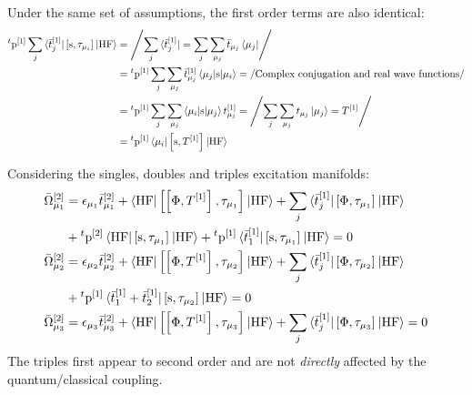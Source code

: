 Under the same set of assumptions, the first order terms are also identical:
\begin{equation}
  \begin{aligned}
  {}^t\mathrm{p}^{[1]} \sum_j\braket{\bar{t}_{j}^{[1]} | \left[ \mathrm{s}, \tau_{\mu_i} \right]^{} | \mathrm{HF}}
  &= \left/ \sum_j\bra{\bar{t}_{j}^{[1]}} = \sum_j\sum_{\mu_j}\bar{t}_{\mu_j}\bra{\mu_j}  \right/ \\
  &=
  {}^t\mathrm{p}^{[1]} \sum_j\sum_{\mu_j}\bar{t}_{\mu_j}^{[1]} \braket{\mu_j| \mathrm{s} | \mu_i}
  = \left/ \text{Complex conjugation and real wave functions} \right/ \\
  &=
  {}^t\mathrm{p}^{[1]} \sum_j\sum_{\mu_j} \braket{\mu_i| \mathrm{s} | \mu_j} t_{\mu_j}^{[1]}
  = \left/ \sum_j\sum_{\mu_j}t_{\mu_j}\ket{\mu_j}  = T^{[1]}\right/ \\
  &=
  {}^t\mathrm{p}^{[1]}\braket{\mu_i | \left[ \mathrm{s}, T^{[1]} \right]^{} | \mathrm{HF}}
 \end{aligned}
\end{equation}

Considering the singles, doubles and triples excitation manifolds:
\begin{subequations}
  \begin{align}
    \bar{\Omega}_{\mu_1}^{[2]} &=
      \epsilon_{\mu_1}\bar{t}_{\mu_1}^{[2]}
      + \braket{\mathrm{HF} | \left[ \left[ \Phi, T^{[1]} \right]^{}, \tau_{\mu_1} \right]^{} | \mathrm{HF}}
      + \sum_j\braket{\bar{t}_{j}^{[1]} |
      \left[ \Phi, \tau_{\mu_1} \right]^{} | \mathrm{HF}} \\
      &+ {}^t\mathrm{p}^{[2]}\braket{\mathrm{HF} |
      \left[ \mathrm{s}, \tau_{\mu_1} \right]^{} | \mathrm{HF}}
      + {}^t\mathrm{p}^{[1]}
      \braket{\bar{t}_{1}^{[1]} |
      \left[ \mathrm{s}, \tau_{\mu_1} \right]^{} | \mathrm{HF}}
      =0 \\
    \bar{\Omega}_{\mu_2}^{[2]} &=
      \epsilon_{\mu_2}\bar{t}_{\mu_2}^{[2]}
      + \braket{\mathrm{HF} | \left[ \left[ \Phi, T^{[1]} \right]^{}, \tau_{\mu_2} \right]^{} | \mathrm{HF}}
      + \sum_j\braket{\bar{t}_{j}^{[1]} |
      \left[ \Phi, \tau_{\mu_2} \right]^{} | \mathrm{HF}} \\
      &+ {}^t\mathrm{p}^{[1]}
      \braket{\bar{t}_{1}^{[1]} + \bar{t}_{2}^{[1]} |
      \left[ \mathrm{s}, \tau_{\mu_2} \right]^{} | \mathrm{HF}}
      =0 \\
    \bar{\Omega}_{\mu_3}^{[2]} &=
      \epsilon_{\mu_3}\bar{t}_{\mu_3}^{[2]}
      + \braket{\mathrm{HF} | \left[ \left[ \Phi, T^{[1]} \right]^{}, \tau_{\mu_3} \right]^{} | \mathrm{HF}}
      + \sum_j\braket{\bar{t}_{j}^{[1]} |
      \left[ \Phi, \tau_{\mu_3} \right]^{} | \mathrm{HF}}
      =0
  \end{align}
\end{subequations}
The triples first appear to second order and are not \emph{directly}
affected by the quantum/classical coupling.

